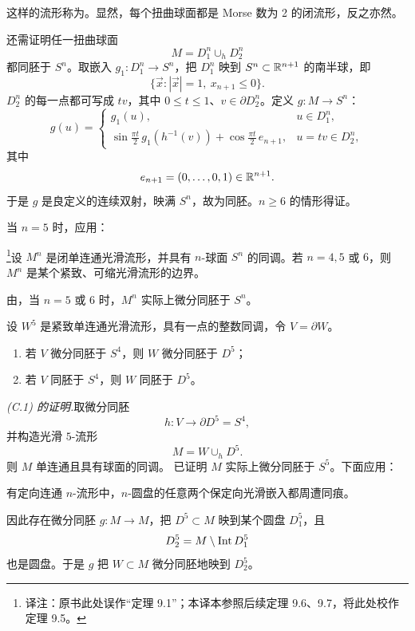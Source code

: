 \Remark\label{rem:twisted-sphere}这样的流形称为\emph{}。显然，每个扭曲球面都是 Morse 数为 2 的闭流形，反之亦然。

还需证明任一扭曲球面
\[
  M=D_1^n\cup_h D_2^n
\]
都同胚于 $S^n$。取嵌入 $g_1:D_1^n\to S^n$，把 $D_1^n$ 映到 $S^n\subset\mathbb{R}^{n+1}$ 的南半球，即
\[
  \{\vec x:|\vec x|=1,\ x_{n+1}\leq0\}.
\]
$D_2^n$ 的每一点都可写成 $tv$，其中 $0\leq t\leq1$、$v\in\partial D_2^n$。定义 $g:M\to S^n$：
\[
g(u)=
\begin{cases}
  g_1(u),&u\in D_1^n,\\[2mm]
  \displaystyle
  \sin\frac{\pi t}{2}\,g_1(h^{-1}(v))
  +\cos\frac{\pi t}{2}\,e_{n+1},
  &u=tv\in D_2^n,
\end{cases}
\]
其中
\[
  e_{n+1}=(0,\ldots,0,1)\in\mathbb{R}^{n+1}.
\]
于是 $g$ 是良定义的连续双射，映满 $S^n$，故为同胚。$n\geq6$ 的情形得证。

当 $n=5$ 时，应用：

\footnote{译注：原书此处误作“定理 9.1”；本译本参照后续定理 9.6、9.7，将此处校作定理 9.5。}设 $M^n$ 是闭单连通光滑流形，并具有 $n$-球面 $S^n$ 的同调。若 $n=4,5$ 或 $6$，则 $M^n$ 是某个紧致、可缩光滑流形的边界。

由，当 $n=5$ 或 $6$ 时，$M^n$ 实际上微分同胚于 $S^n$。
\EndProof

设 $W^5$ 是紧致单连通光滑流形，具有一点的整数同调，令 $V=\partial W$。
\begin{enumerate}[label=(C.\arabic*)]
  \item 若 $V$ 微分同胚于 $S^4$，则 $W$ 微分同胚于 $D^5$；
  \item 若 $V$ 同胚于 $S^4$，则 $W$ 同胚于 $D^5$。
\end{enumerate}

\par\medskip\noindent\textit{(C.1) 的证明.}\quad 取微分同胚
\[
  h:V\longrightarrow\partial D^5=S^4,
\]
并构造光滑 $5$-流形
\[
  M=W\cup_hD^5.
\]
则 $M$ 单连通且具有球面的同调。 已证明 $M$ 实际上微分同胚于 $S^5$。下面应用：

有定向连通 $n$-流形中，$n$-圆盘的任意两个保定向光滑嵌入都周遭同痕。

因此存在微分同胚 $g:M\to M$，把 $D^5\subset M$ 映到某个圆盘 $D_1^5$，且
\[
  D_2^5=M\setminus\operatorname{Int} D_1^5
\]
也是圆盘。于是 $g$ 把 $W\subset M$ 微分同胚地映到 $D_2^5$。
\EndProof


